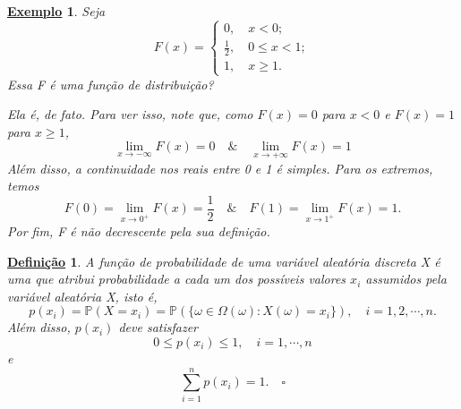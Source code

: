 \documentclass{article}
\newtheorem*{def*}{\underline{Defini\c c\~ao}}
\newtheorem{example}{\underline{Exemplo}}
\begin{document}
\begin{example}
Seja 
  \[
    F(x)  = \left\{\begin{array}{ll}
        0,\quad x < 0;\\
        \frac{1}{2},\quad 0\leq x < 1;\\
        1,\quad x\geq 1.
      \end{array}\right.
  \]
  Essa F é uma função de distribuição?

  Ela é, de fato. Para ver isso, note que, como \(F(x) = 0\) para \(x < 0\) e \(F(x) = 1\) para 
 \(x\geq 1\),
  \[
    \lim_{x\to -\infty} F(x) = 0\quad\&\quad \lim_{x\to +\infty}F(x) = 1
  \]
  Além disso, a continuidade nos reais entre 0 e 1 é simples. Para os extremos, temos 
    \[
      F(0) = \lim_{x\to 0^{+}}F(x) = \frac{1}{2}\quad\&\quad F(1) = \lim_{x\to 1^{+}}F(x) = 1.
    \]
  Por fim, F é não decrescente pela sua definição.  
\end{example}
\begin{def*}
  A função de probabilidade de uma variável aleatória discreta X é uma que atribui probabilidade
a cada um dos possíveis valores \(x_{i}\) assumidos pela variável aleatória X, isto é, 
  \[
    p(x_{i}) = \mathbb{P}(X = x_{i}) = \mathbb{P}(\{\omega \in \Omega (\omega ): X(\omega ) = x_{i}\}),\quad i = 1, 2, \cdots, n.
  \]
  Além disso, \(p(x_{i})\) deve satisfazer 
    \[
      0\leq p(x_{i})\leq 1,\quad i = 1, \cdots, n
    \]
  e 
    \[
      \sum\limits_{i=1}^{n}p(x_{i}) = 1.\quad \square
    \]
\end{def*}
\end{document}
